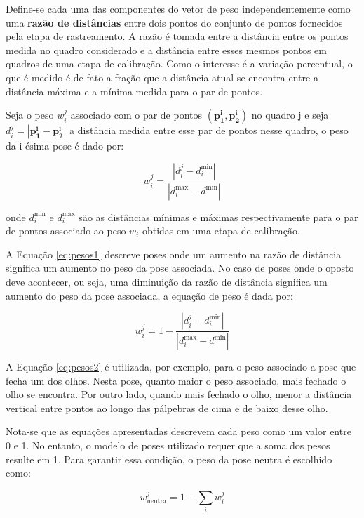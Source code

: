 Define-se cada uma das componentes do vetor de peso independentemente como uma
\textbf{razão de distâncias} entre dois pontos do conjunto de pontos fornecidos
pela etapa de rastreamento. A razão é tomada entre a distância entre os pontos
medida no quadro considerado e a distância entre esses mesmos pontos em quadros
de uma etapa de calibração. Como o interesse é a variação percentual, o que é
medido é de fato a fração que a distância atual se encontra entre a distância
máxima e a mínima medida para o par de pontos.

Seja o peso $w_i^j$ associado com o par de pontos $(\bm{p_1^i}, \bm{p_2^i})$ no
quadro j e seja $d_i^j = |\bm{p_1^i} - \bm{p_2^i}|$ a distância medida entre
esse par de pontos nesse quadro, o peso da i-ésima pose é dado por:

\begin{equation}
	w_i^j = \frac{|d_i^j - d_i^{\text{min}}|}{|d_i^{\text{max}} - d^{\text{min}}|}
   \label{eq:pesos1}
\end{equation}

onde $d_i^{\text{min}}$ e $d_i^{\text{max}}$ são as distâncias mínimas e máximas
respectivamente para o par de pontos associado ao peso $w_i$ obtidas em uma
etapa de calibração. 

A Equação \ref{eq:pesos1} descreve poses onde um aumento na razão de distância
significa um aumento no peso da pose associada. No caso de poses onde o oposto
deve acontecer, ou seja, uma diminuição da razão de distância significa um
aumento do peso da pose associada, a equação de peso é dada por: 

\begin{equation}
	w_i^j = 1 - \frac{|d_i^j - d_i^{\text{min}}|}{|d_i^{\text{max}} - d^{\text{min}}|}
    \label{eq:pesos2}
\end{equation}

A Equação \ref{eq:pesos2} é utilizada, por exemplo, para o peso associado a pose
que fecha um dos olhos. Nesta pose, quanto maior o peso associado, mais fechado
o olho se encontra. Por outro lado, quando mais fechado o olho, menor a
distância vertical entre pontos ao longo das pálpebras de cima e de baixo desse
olho.

Nota-se que as equações apresentadas descrevem cada peso como um valor entre 0 e
1. No entanto, o modelo de poses utilizado requer que a soma dos pesos resulte
em 1. Para garantir essa condição, o peso da pose neutra é escolhido como:

\begin{equation}
	w_{\text{neutra}}^j = 1 - \sum_{i} w_i^j
    \label{eq:pesos3}
\end{equation}

